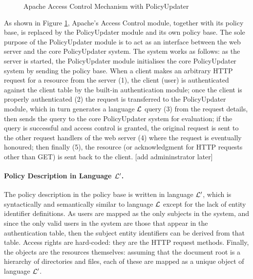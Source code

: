 \documentclass{llncs}
\begin{document}
      \begin{figure}[ht]
        \begin{center}
          \caption{Apache Access Control Mechanism with PolicyUpdater}
          \label{fig-2}
        \end{center}
      \end{figure}

      As shown in Figure \ref{fig-2}, Apache's Access Control module, together
      with its policy base, is replaced by the PolicyUpdater module and its own
      policy base. The sole purpose of the PolicyUpdater module is to act as an
      interface between the web server and the core PolicyUpdater system. The
      system works as follows: as the server is started, the PolicyUpdater
      module initialises the core PolicyUpdater system by sending the policy
      base. When a client makes an arbitrary HTTP request for a resource from
      the server (1), the client (user) is authenticated against the client
      table by the built-in authentication module; once the client is properly
      authenticated (2) the request is transferred to the PolicyUpdater module,
      which in turn generates a language ${\cal L}$ query (3) from the request
      details, then sends the query to the core PolicyUpdater system for
      evaluation; if the query is successful and access control is granted,
      the original request is sent to the other request handlers of the web
      server (4) where the request is eventually honoured; then finally (5),
      the resource (or acknowledgment for HTTP requests other than GET) is sent
      back to the client. [add admininstrator later]

      \paragraph{\bf Policy Description in Language ${\cal L'}$.}

        The policy description in the policy base is written in language
        ${\cal L'}$, which is syntactically and semantically similar to
        language ${\cal L}$ except for the lack of entity identifier
        definitions. As users are mapped as the only subjects in the system,
        and since the only valid users in the system are those that appear in
        the authentication table, then the subject entity identifiers can be
        derived from that table. Access rights are hard-coded: they are the
        HTTP request methods. Finally, the objects are the resources
        themselves: assuming that the document root is a hierarchy of
        directories and files, each of these are mapped as a unique object of
        language ${\cal L'}$.
\end{document}
